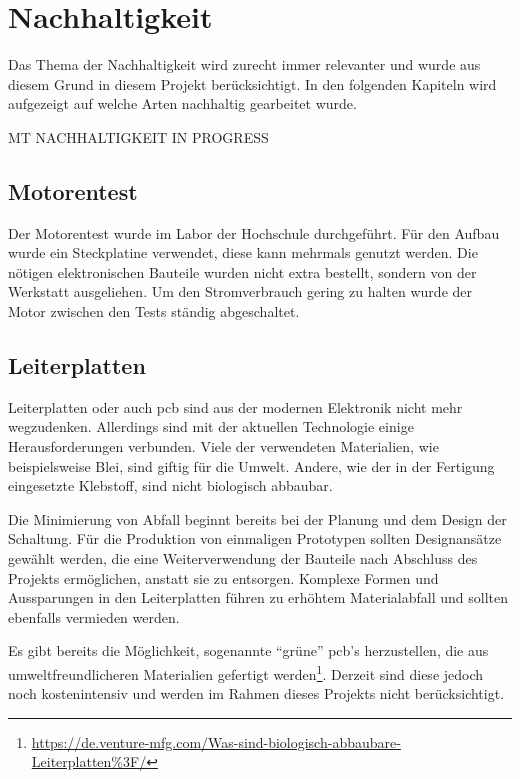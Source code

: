 \section{Nachhaltigkeit}
\label{section:Nachhaltigkeit}

Das Thema der Nachhaltigkeit wird zurecht immer relevanter und wurde aus diesem Grund in diesem Projekt berücksichtigt. In den folgenden Kapiteln wird aufgezeigt auf welche Arten nachhaltig gearbeitet wurde.


MT NACHHALTIGKEIT IN PROGRESS


\subsection{Motorentest}

Der Motorentest wurde im Labor der Hochschule durchgeführt. Für den Aufbau wurde ein Steckplatine verwendet, diese kann mehrmals genutzt werden. Die nötigen elektronischen Bauteile wurden nicht extra bestellt, sondern von der Werkstatt ausgeliehen. Um den Stromverbrauch gering zu halten wurde der Motor zwischen den Tests ständig abgeschaltet. 

\subsection{Leiterplatten}
\label{Leiterplatten}

Leiterplatten oder auch \acrfull{pcb} sind aus der modernen Elektronik nicht mehr wegzudenken. Allerdings sind mit der aktuellen Technologie einige Herausforderungen verbunden. Viele der verwendeten Materialien, wie beispielsweise Blei, sind giftig für die Umwelt. Andere, wie der in der Fertigung eingesetzte Klebstoff, sind nicht biologisch abbaubar.

Die Minimierung von Abfall beginnt bereits bei der Planung und dem Design der Schaltung. Für die Produktion von einmaligen Prototypen sollten Designansätze gewählt werden, die eine Weiterverwendung der Bauteile nach Abschluss des Projekts ermöglichen, anstatt sie zu entsorgen. Komplexe Formen und Aussparungen in den Leiterplatten führen zu erhöhtem Materialabfall und sollten ebenfalls vermieden werden.

Es gibt bereits die Möglichkeit, sogenannte ``grüne'' \acrshort{pcb}'s herzustellen, die aus umweltfreundlicheren Materialien gefertigt werden\footnote{\url{https://de.venture-mfg.com/Was-sind-biologisch-abbaubare-Leiterplatten\%3F/}}.  Derzeit sind diese jedoch noch kostenintensiv und werden im Rahmen dieses Projekts nicht berücksichtigt.

